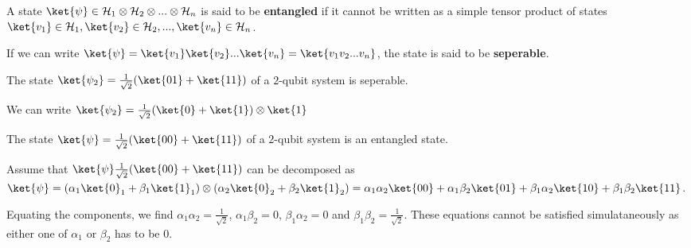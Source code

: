 \begin{defn}
    A state $\ket{\psi} \in \mathcal{H}_1 \otimes \mathcal{H}_2 \otimes ... \otimes \mathcal{H}_n$ is said to be \textbf{entangled} if it cannot be written as a simple tensor product of states $\ket{v_1} \in \mathcal{H}_1, \ket{v_2} \in \mathcal{H}_2, ..., \ket{v_n} \in \mathcal{H}_n$. 

    If we can write $\ket{\psi} = \ket{v_1}\ket{v_2}...\ket{v_n} = \ket{v_1 v_2...v_n}$, the state is said to be \textbf{seperable}.
\end{defn}

\begin{eg}
The state $\ket{\psi_2} = \frac{1}{\sqrt{2}} (\ket{01} + \ket{11})$ of a $2$-qubit system is seperable. 

We can write $\ket{\psi_2} = \frac{1}{\sqrt{2}} (\ket{0} + \ket{1}) \otimes \ket{1}$
\end{eg}


\begin{eg}
The state $\ket{\psi} = \frac{1}{\sqrt{2}} (\ket{00} + \ket{11})$ of a $2$-qubit system is an entangled state.

    Assume that  $\ket{\psi} \frac{1}{\sqrt{2}} (\ket{00} + \ket{11}) $ can be decomposed as $\ket{\psi} = (\alpha_1 \ket{0}_1 + \beta_1 \ket{1}_1) \otimes (\alpha_2 \ket{0}_2 + \beta_2 \ket{1}_2) = \alpha_1 \alpha_2 \ket{00} + \alpha_1 \beta_2 \ket{01} + \beta_1 \alpha_2 \ket{10} + \beta_1 \beta_2 \ket{11}$.

    Equating the components, we find $\alpha_1 \alpha_2 = \displaystyle\frac{1}{\sqrt{2}}$, $\alpha_1 \beta_2 = 0$, $\beta_1 \alpha_2 = 0$ and $\beta_1 \beta_2 = \displaystyle\frac{1}{\sqrt{2}}$. These equations cannot be satisfied simulataneously as either one of $\alpha_1$ or $\beta_2$ has to be $0$.
\end{eg}

